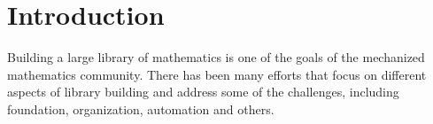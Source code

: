 \chapter{Introduction}


Building a large library of mathematics is one of the goals of the mechanized mathematics community. There has been many efforts that focus on different aspects of library building  
and address some of the challenges, including foundation, organization, automation and others. 

